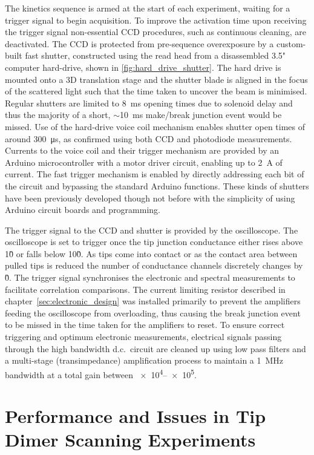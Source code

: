 \documentclass[12pt, a4paper, twoside]{book}
\begin{document}
The kinetics sequence is armed at the start of each experiment, waiting for a trigger signal to begin acquisition. To improve the activation time upon receiving the trigger signal non-essential CCD procedures, such as continuous cleaning, are deactivated. The CCD is protected from pre-sequence overexposure by a custom-built fast shutter, constructed using the read head from a disassembled 3.5" computer hard-drive, shown in \autoref{fig:hard_drive_shutter}. The hard drive is mounted onto a 3D translation stage and the shutter blade is aligned in the focus of the scattered light such that the time taken to uncover the beam is minimised. Regular shutters are limited to \SI{8}{ms} opening times due to solenoid delay and thus the majority of a short, $\sim$\SI{10}{ms} make/break junction event would be missed. Use of the hard-drive voice coil mechanism enables shutter open times of around \SI{300}{\micro\second}, as confirmed using both CCD and photodiode measurements. Currents to the voice coil and their trigger mechanism are provided by an Arduino microcontroller with a motor driver circuit, enabling up to \SI{2}{A} of current. The fast trigger mechanism is enabled by directly addressing each bit of the circuit and bypassing the standard Arduino functions. These kinds of shutters have been previously developed \cite{maguire2004high, scholten2007enhanced} though not before with the simplicity of using Arduino circuit boards and programming.

The trigger signal to the CCD and shutter is provided by the oscilloscope. The oscilloscope is set to trigger once the tip junction conductance either rises above 1\G0 or falls below 10\G0. As tips come into contact or as the contact area between pulled tips is reduced the number of conductance channels discretely changes by \G0. The trigger signal synchronises the electronic and spectral measurements to facilitate correlation comparisons.
The current limiting resistor described in chapter~\ref{sec:electronic_design} was installed primarily to prevent the amplifiers feeding the oscilloscope from overloading, thus causing the break junction event to be missed in the time taken for the amplifiers to reset.
To ensure correct triggering and optimum electronic measurements, electrical signals passing through the high bandwidth d.c.\ circuit are cleaned up using low pass filters and a multi-stage (transimpedance) amplification process to maintain a \SI{1}{MHz} bandwidth at a total gain between \num{e4}--\num{e5}.

\FloatBarrier
\section{Performance and Issues in Tip Dimer Scanning Experiments}
\end{document}
